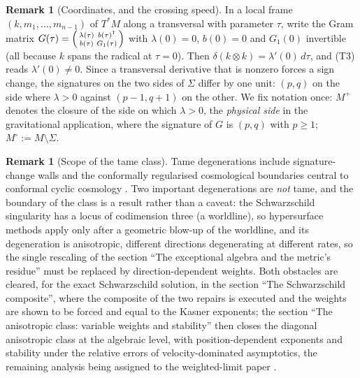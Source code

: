 \documentclass[11pt]{article}
\theoremstyle{definition}
\newtheorem{remark}[theorem]{Remark}
\theoremstyle{plain}
\providecommand{\Mo}{}\renewcommand{\Mo}{M^{\circ}}
\providecommand{\Mp}{}\renewcommand{\Mp}{M^{+}}
\providecommand{\Sig}{}\renewcommand{\Sig}{\Sigma}
\begin{document}
\begin{remark}[Coordinates, and the crossing speed]\label{c:note.sheaf.coordinates-crossing-speed}
In a local frame $(k, m_1, \dots, m_{n-1})$ of $T^*M$ along a transversal with parameter $\tau$, write the Gram matrix $G(\tau) = \begin{psmallmatrix} \lambda(\tau) & b(\tau)^{\mathsf T} \\ b(\tau) & G_1(\tau)\end{psmallmatrix}$ with $\lambda(0) = 0$, $b(0) = 0$ and $G_1(0)$ invertible (all because $k$ spans the radical at $\tau = 0$). Then $\delta(k \otimes k) = \lambda'(0)\, d\tau$, and (T3) reads $\lambda'(0) \neq 0$. Since a transversal derivative that is nonzero forces a sign change, the signatures on the two sides of $\Sig$ differ by one unit: $(p,q)$ on the side where $\lambda > 0$ against $(p{-}1, q{+}1)$ on the other. We fix notation once: $\Mp$ denotes the closure of the side on which $\lambda > 0$, the \emph{physical side} in the gravitational application, where the signature of $G$ is $(p, q)$ with $p \geq 1$; $\Mo := M \setminus \Sig$.
\end{remark}

\begin{remark}[Scope of the tame class]\label{c:note.sheaf.scope-tame-class}
Tame degenerations include signature-change walls and the conformally regularised cosmological boundaries central to conformal cyclic cosmology \cite{Penrose2010}. Two important degenerations are \emph{not} tame, and the boundary of the class is a result rather than a caveat: the Schwarzschild singularity has a locus of codimension three (a worldline), so hypersurface methods apply only after a geometric blow-up of the worldline, and its degeneration is anisotropic, different directions degenerating at different rates, so the single rescaling of the section ``The exceptional algebra and the metric's residue'' must be replaced by direction-dependent weights. Both obstacles are cleared, for the exact Schwarzschild solution, in the section ``The Schwarzschild composite'', where the composite of the two repairs is executed and the weights are shown to be forced and equal to the Kasner exponents; the section ``The anisotropic class: variable weights and stability'' then closes the diagonal anisotropic class at the algebraic level, with position-dependent exponents and stability under the relative errors of velocity-dominated asymptotics, the remaining analysis being assigned to the weighted-limit paper \cite{ButlerT6}.
\end{remark}
\end{document}
